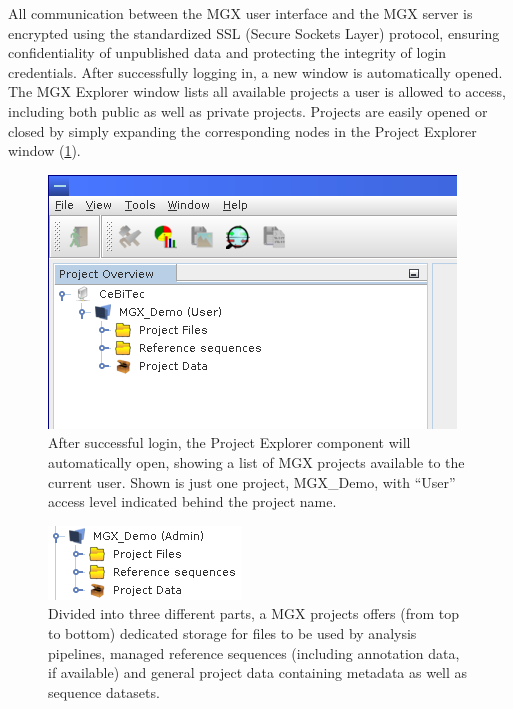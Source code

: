 All communication between the MGX user interface and the MGX server is encrypted using
the standardized SSL (Secure Sockets Layer) protocol, ensuring confidentiality of 
unpublished data and protecting the integrity of login credentials.
After successfully logging in, a new window is automatically opened. The MGX Explorer window
lists all available projects a user is allowed to access, including both public as well as
private projects. Projects are easily opened or closed by simply expanding the corresponding
nodes in the Project Explorer window (\ref{projects}).\\

\begin{figure}[H]
\centering
\includegraphics[width=.8\textwidth]{img/mgx/projects}
\caption[Project Explorer]{After successful login, the Project Explorer component will automatically open,
showing a list of MGX projects available to the current user. Shown is just one project, MGX\_Demo, with
``User'' access level indicated behind the project name.}
\label{projects}
\end{figure}

\begin{figure}[H]
\centering
\includegraphics[width=.4\textwidth]{img/mgx/projstructure}
\caption[Project structure]{Divided into three different parts, a MGX projects offers
(from top to bottom) dedicated storage for files to be used by analysis pipelines, 
managed reference sequences (including annotation data, if available) and general
project data containing metadata as well as sequence datasets.}
\label{structure}
\end{figure}

